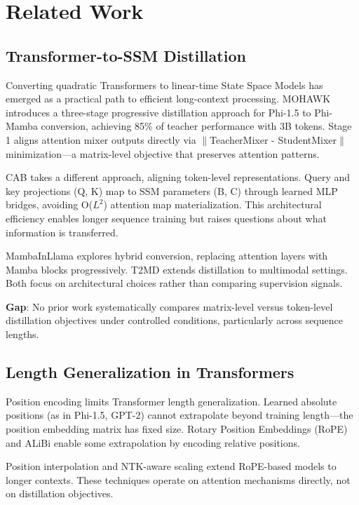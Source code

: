 \section{Related Work}

\subsection{Transformer-to-SSM Distillation}

Converting quadratic Transformers to linear-time State Space Models has emerged as a practical path to efficient long-context processing. MOHAWK \citep{bick2024mohawk} introduces a three-stage progressive distillation approach for Phi-1.5 to Phi-Mamba conversion, achieving 85\% of teacher performance with 3B tokens. Stage 1 aligns attention mixer outputs directly via $\|$TeacherMixer - StudentMixer$\|$ minimization---a matrix-level objective that preserves attention patterns.

CAB \citep{wang2025cab} takes a different approach, aligning token-level representations. Query and key projections (Q, K) map to SSM parameters (B, C) through learned MLP bridges, avoiding O($L^2$) attention map materialization. This architectural efficiency enables longer sequence training but raises questions about what information is transferred.

MambaInLlama \citep{wang2024mammainllama} explores hybrid conversion, replacing attention layers with Mamba blocks progressively. T2MD \citep{zhang2024t2md} extends distillation to multimodal settings. Both focus on architectural choices rather than comparing supervision signals.

\textbf{Gap}: No prior work systematically compares matrix-level versus token-level distillation objectives under controlled conditions, particularly across sequence lengths.

\subsection{Length Generalization in Transformers}

Position encoding limits Transformer length generalization. Learned absolute positions (as in Phi-1.5, GPT-2) cannot extrapolate beyond training length---the position embedding matrix has fixed size. Rotary Position Embeddings (RoPE) \citep{su2021roformer} and ALiBi \citep{press2021alibi} enable some extrapolation by encoding relative positions.

Position interpolation \citep{chen2023extending} and NTK-aware scaling extend RoPE-based models to longer contexts. These techniques operate on attention mechanisms directly, not on distillation objectives.

